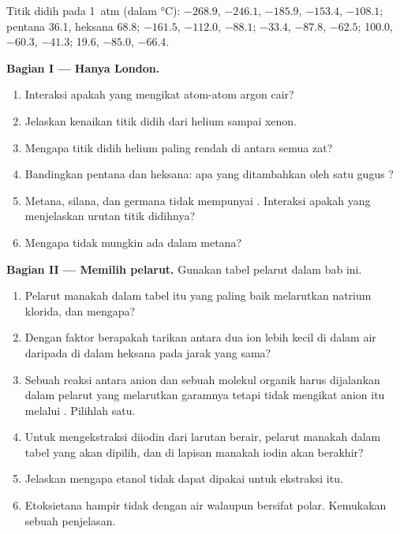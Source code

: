 \begin{problem}
\label{pb:b1:intermolecular-forces-solvents:1}
Titik didih pada \qty{1}{atm} (dalam \unit{\celsius}):  $-268.9$,
 $-246.1$,  $-185.9$,  $-153.4$,  $-108.1$;
pentana 36.1, heksana 68.8;  $-161.5$,  $-112.0$,
 $-88.1$;  $-33.4$,  $-87.8$,  $-62.5$;
 100.0,  $-60.3$,  $-41.3$;  19.6,
 $-85.0$,  $-66.4$.

\medskip
\noindent\textbf{Bagian I --- Hanya London.}
\begin{enumerate}
  \item Interaksi apakah yang mengikat atom-atom argon cair?
  \item Jelaskan kenaikan titik didih dari helium sampai xenon.
  \item Mengapa titik didih helium paling rendah di antara semua zat?
  \item Bandingkan pentana dan heksana: apa yang ditambahkan oleh satu
        gugus ?
  \item Metana, silana, dan germana tidak mempunyai .
        Interaksi apakah yang menjelaskan urutan titik didihnya?
  \item Mengapa tidak mungkin ada  dalam metana?
\end{enumerate}

\medskip
\noindent\textbf{Bagian II --- Memilih pelarut.}
Gunakan tabel pelarut dalam bab ini.
\begin{enumerate}[resume]
  \item Pelarut manakah dalam tabel itu yang paling baik melarutkan
        natrium klorida, dan mengapa?
  \item Dengan faktor berapakah tarikan antara dua ion lebih kecil di
        dalam air daripada di dalam heksana pada jarak yang sama?
  \item Sebuah reaksi antara anion  dan sebuah molekul organik
        harus dijalankan dalam pelarut yang melarutkan garamnya tetapi
        tidak mengikat anion itu melalui . Pilihlah satu.
  \item Untuk mengekstraksi diiodin dari larutan berair, pelarut manakah
        dalam tabel yang akan dipilih, dan di lapisan manakah iodin akan
        berakhir?
  \item Jelaskan mengapa etanol tidak dapat dipakai untuk ekstraksi itu.
  \item Etoksietana hampir tidak  dengan air walaupun
        bersifat polar. Kemukakan sebuah penjelasan.
\end{enumerate}


\end{problem}

